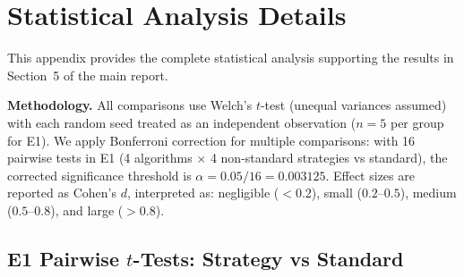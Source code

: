 \documentclass[11pt,a4paper]{article}
\begin{document}
\section{Statistical Analysis Details}
\label{app:stats}

This appendix provides the complete statistical analysis supporting the results in Section~5 of the main report.

\textbf{Methodology.} All comparisons use Welch's $t$-test (unequal variances assumed) with each random seed treated as an independent observation ($n = 5$ per group for E1). We apply Bonferroni correction for multiple comparisons: with 16 pairwise tests in E1 (4 algorithms $\times$ 4 non-standard strategies vs standard), the corrected significance threshold is $\alpha = 0.05 / 16 = 0.003125$. Effect sizes are reported as Cohen's $d$, interpreted as: negligible ($< 0.2$), small ($0.2$--$0.5$), medium ($0.5$--$0.8$), and large ($> 0.8$).

\subsection{E1 Pairwise $t$-Tests: Strategy vs Standard}
\end{document}
